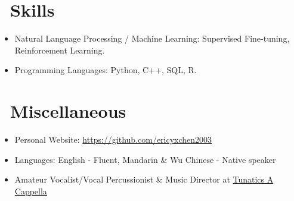 \documentclass[colorlinks, linkcolor=blue]{resume}
\begin{document}
\section{\faCogs\ Skills}
\begin{itemize}[parsep=0.5ex]
  \item Natural Language Processing / Machine Learning: Supervised Fine-tuning, Reinforcement Learning.
  \item Programming Languages: Python, C++, SQL, R.
\end{itemize}


\section{\faInfo\ Miscellaneous}
\begin{itemize}[parsep=0.5ex]

  \item Personal Website: \href{https://ericyxchen2003.github.io/}{https://github.com/ericyxchen2003}
  \item Languages: English - Fluent, Mandarin \& Wu Chinese - Native speaker
  \item Amateur Vocalist/Vocal Percussionist \& Music Director at \href{https://linktr.ee/tunaticsacappella}{Tunatics A Cappella}
\end{itemize}

%
%
\end{document}
